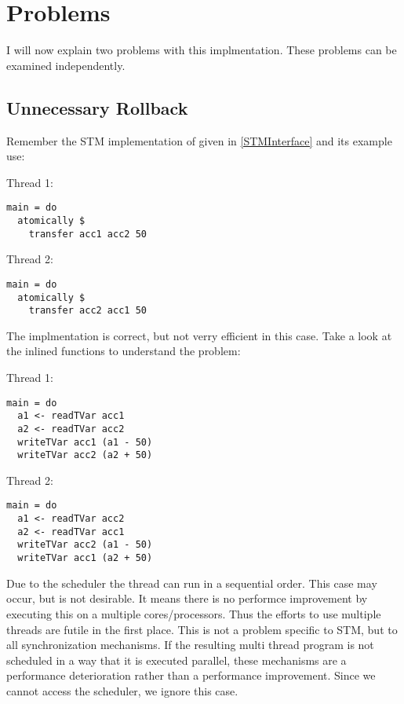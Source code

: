\section{Problems}
I will now explain two problems with this implmentation. These problems can be examined independently.

\subsection{Unnecessary Rollback}
Remember the STM implementation of  given in \ref{STMInterface} and its example use: 
\par\noindent
\begin{minipage}[t]{.45\textwidth}
Thread 1:
\begin{lstlisting}[frame=lrtb]
main = do
  atomically $
    transfer acc1 acc2 50
\end{lstlisting}
\end{minipage}
\hfill
\begin{minipage}[t]{.45\textwidth}
Thread 2:
\begin{lstlisting}[frame=lrtb]
main = do 
  atomically $ 
    transfer acc2 acc1 50
\end{lstlisting}
\end{minipage}
The implmentation is correct, but not verry efficient in this case. Take a look at the inlined functions to understand the 
problem:
\par\noindent
\begin{minipage}[t]{.45\textwidth}
Thread 1:
\begin{lstlisting}[frame=lrtb]
main = do
  a1 <- readTVar acc1
  a2 <- readTVar acc2
  writeTVar acc1 (a1 - 50)
  writeTVar acc2 (a2 + 50)
\end{lstlisting}
\end{minipage}
\hfill
\begin{minipage}[t]{.45\textwidth}
Thread 2:
\begin{lstlisting}[frame=lrtb]
main = do 
  a1 <- readTVar acc2
  a2 <- readTVar acc1
  writeTVar acc2 (a1 - 50)
  writeTVar acc1 (a2 + 50)
\end{lstlisting}
\end{minipage}

Due to the scheduler the thread can run in a sequential order. This case may occur, but is not desirable. It means 
there is no performce improvement by executing this on a multiple cores/processors. Thus the efforts to use multiple
threads are futile in the first place. This is not a problem specific to STM, but to all synchronization mechanisms. 
If the resulting multi thread program is not scheduled in a way that it is executed parallel, these mechanisms are a
performance deterioration rather than a performance improvement. Since we cannot access the scheduler, we ignore 
this case. 

